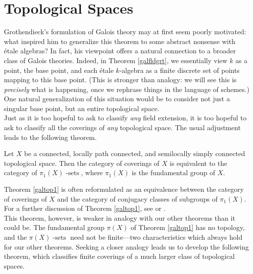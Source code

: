 \documentclass[11pt,openany]{book} %
\begin{document}

\section{Topological Spaces} \label{secgaltop}
Grothendieck's formulation of Galois theory may at first seem poorly motivated: what inspired him to generalize this theorem to some abstract nonsense with \'etale algebras? In fact, his viewpoint offers a natural connection to a broader class of Galois theories. Indeed, in Theorem \ref{galfldgrt}, we essentially view $k$ as a point, the base point, and each \'etale $k$-algebra as a finite discrete set of points mapping to this base point. (This is stronger than analogy: we will see this is \emph{precisely} what is happening, once we rephrase things in the language of schemes.) One natural generalization of this situation would be to consider not just a singular base point, but an entire topological space.\\

Just as it is too hopeful to ask to classify \emph{any} field extension, it is too hopeful to ask to classify all the coverings of \emph{any} topological space. The usual adjustment leads to the following theorem.\\

\begin{theorem} \label{galtop1}
Let $X$ be a connected, locally path connected, and semilocally simply connected topological space. Then the category of coverings of $X$ is equivalent to the category of $\pi_1(X)\operatorname{-sets}$, where $\pi_1(X)$ is the fundamental group of $X$.
\end{theorem}

Theorem \ref{galtop1} is often reformulated as an equivalence between the category of coverings of $X$ and the category of conjugacy classes of subgroups of $\pi_1(X)$. For a further discussion of Theorem \ref{galtop1}, see \cite{munkres} or \cite{massey}.\\

This theorem, however, is weaker in analogy with our other theorems than it could be. The fundamental group $\pi(X)$ of Theorem \ref{galtop1} has no topology, and the $\pi(X)\operatorname{-sets}$ need not be finite---two characteristics which always hold for our other theorems. Seeking a closer analogy leads us to develop the following theorem, which classifies finite coverings of a much larger class of topological spaces.\\
\end{document}
